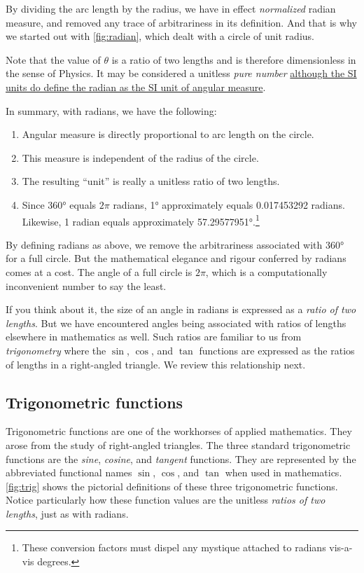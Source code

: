 \documentclass[
  a4paper,
]{article}
\providecommand{\tightlist}{%
  \setlength{\itemsep}{0pt}\setlength{\parskip}{0pt}}
\begin{document}
By dividing the arc length by the radius, we have in effect
\emph{normalized} radian measure, and removed any trace of arbitrariness
in its definition. And that is why we started out with
\cref{fig:radian}, which dealt with a circle of unit radius.

Note that the value of \(\theta\) is a ratio of two lengths and is
therefore dimensionless in the sense of Physics. It may be considered a
unitless \emph{pure number}
\href{https://en.wikipedia.org/wiki/Radian}{although the SI units do
define the radian as the SI unit of angular measure}.

In summary, with radians, we have the following:

\begin{enumerate}
\tightlist
\item
  Angular measure is directly proportional to arc length on the circle.
\item
  This measure is independent of the radius of the circle.
\item
  The resulting ``unit'' is really a unitless ratio of two lengths.
\item
  Since 360° equals \(2\pi\) radians, 1° approximately equals
  0.017453292 radians. Likewise, 1 radian equals approximately
  57.29577951°.\footnote{These conversion factors must dispel any
    mystique attached to radians vis-a-vis degrees.}
\end{enumerate}

By defining radians as above, we remove the arbitrariness associated
with 360° for a full circle. But the mathematical elegance and rigour
conferred by radians comes at a cost. The angle of a full circle is
\(2\pi\), which is a computationally inconvenient number to say the
least.

If you think about it, the size of an angle in radians is expressed as a
\emph{ratio of two lengths}. But we have encountered angles being
associated with ratios of lengths elsewhere in mathematics as well. Such
ratios are familiar to us from \emph{trigonometry} where the \(\sin\),
\(\cos\), and \(\tan\) functions are expressed as the ratios of lengths
in a right-angled triangle. We review this relationship next.

\hypertarget{trigonometric-functions}{%
\subsection{Trigonometric functions}\label{trigonometric-functions}}

Trigonometric functions are one of the workhorses of applied
mathematics. They arose from the study of right-angled triangles. The
three standard trigonometric functions are the \emph{sine},
\emph{cosine}, and \emph{tangent} functions. They are represented by the
abbreviated functional names \(\sin\), \(\cos\), and \(\tan\) when used
in mathematics. \cref{fig:trig} shows the pictorial definitions of these
three trigonometric functions. Notice particularly how these function
values are the unitless \emph{ratios of two lengths}, just as with
radians.
\end{document}

